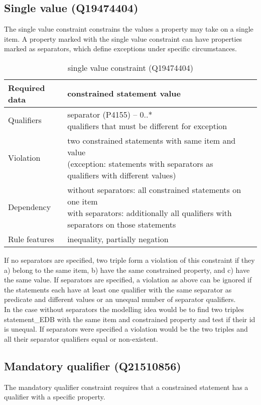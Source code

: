 \documentclass[hyperref,bachelorofscience,fleqn]{cgvpub}
\begin{document}
\subsection{Single value (Q19474404)}
The single value constraint constrains the values a property may take on a single item. A property marked with the single value constraint can have properties marked as separators, which define exceptions under specific circumstances.
\begin{table}[H]
\caption{single value constraint (Q19474404)}
\begin{tabularx}{\textwidth}{ ll X}
\hline
Required data & constrained statement value \\
\hline
Qualifiers & \makecell{separator (P4155) -- 0..* \\ qualifiers that must be different for exception} \\
\hline
Violation & \makecell{two constrained statements with same item and value \\ (exception: statements with separators as qualifiers with different values)} \\
\hline
Dependency & \makecell{without separators: all constrained statements on one item \\ with separators: additionally all qualifiers with separators on those statements }\\
\hline
Rule features & inequality, partially negation \\
\hline
\end{tabularx}
\end{table}

If no separators are specified, two triple form a violation of this constraint if they a) belong to the same item, b) have the same constrained property, and c) have the same value.
If separators are specified, a violation as above can be ignored if the statements each have at least one qualifier with the same separator as predicate and different values or an unequal number of separator qualifiers.\\
In the case without separators the modelling idea would be to find two triples statement\_EDB with the same item and constrained property and test if their id is unequal. If separators were specified a violation would be the two triples and all their separator qualifiers equal or non-existent.

\subsection{Mandatory qualifier (Q21510856)}
The mandatory qualifier constraint requires that a constrained statement has a qualifier with a specific property.
\end{document}
